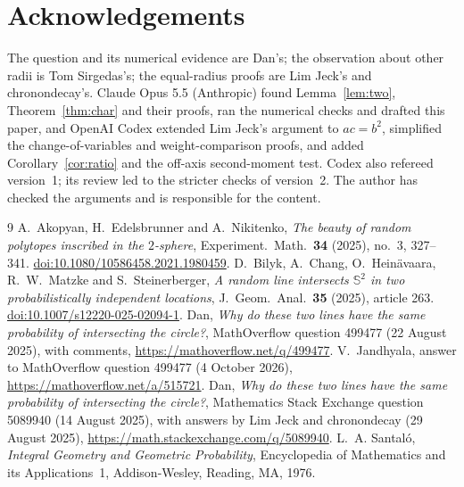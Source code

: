 \documentclass[11pt]{amsart}
\theoremstyle{remark}
\begin{document}
\section*{Acknowledgements}

The question and its numerical evidence are Dan's; the observation about other radii is Tom Sirgedas's; the equal-radius proofs are Lim Jeck's and chronondecay's. Claude Opus 5.5 (Anthropic) found Lemma~\ref{lem:two}, Theorem~\ref{thm:char} and their proofs, ran the numerical checks and drafted this paper, and OpenAI Codex extended Lim Jeck's argument to $ac=b^2$, simplified the change-of-variables and weight-comparison proofs, and added Corollary~\ref{cor:ratio} and the off-axis second-moment test. Codex also refereed version~1; its review led to the stricter checks of version~2. The author has checked the arguments and is responsible for the content.

\begin{thebibliography}{9}
 A.~Akopyan, H.~Edelsbrunner and A.~Nikitenko, \emph{The beauty of random polytopes inscribed in the $2$-sphere}, Experiment.\ Math.\ \textbf{34} (2025), no.~3, 327--341. \href{https://doi.org/10.1080/10586458.2021.1980459}{doi:10.1080/10586458.2021.1980459}.
 D.~Bilyk, A.~Chang, O.~Hein\"avaara, R.~W.~Matzke and S.~Steinerberger, \emph{A random line intersects $\mathbb{S}^2$ in two probabilistically independent locations}, J.\ Geom.\ Anal.\ \textbf{35} (2025), article 263. \href{https://doi.org/10.1007/s12220-025-02094-1}{doi:10.1007/s12220-025-02094-1}.
 Dan, \emph{Why do these two lines have the same probability of intersecting the circle?}, MathOverflow question 499477 (22 August 2025), with comments, \url{https://mathoverflow.net/q/499477}.
 V.~Jandhyala, answer to MathOverflow question 499477 (4 October 2026), \url{https://mathoverflow.net/a/515721}.
 Dan, \emph{Why do these two lines have the same probability of intersecting the circle?}, Mathematics Stack Exchange question 5089940 (14 August 2025), with answers by Lim Jeck and chronondecay (29 August 2025), \url{https://math.stackexchange.com/q/5089940}.
 L.~A. Santal\'o, \emph{Integral Geometry and Geometric Probability}, Encyclopedia of Mathematics and its Applications~1, Addison-Wesley, Reading, MA, 1976.
\end{thebibliography}
\end{document}
